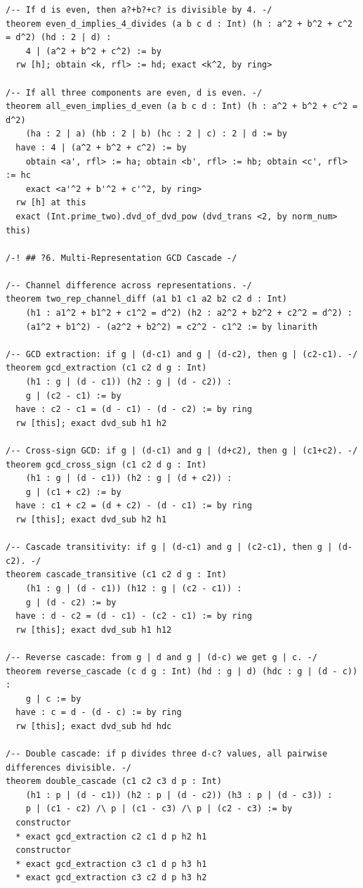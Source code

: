 \documentclass[11pt,twoside,openright]{book}
\theoremstyle{definition}
\theoremstyle{remark}
\begin{document}
\begin{lstlisting}[style=lean]
/-- If d is even, then a?+b?+c? is divisible by 4. -/
theorem even_d_implies_4_divides (a b c d : Int) (h : a^2 + b^2 + c^2 = d^2) (hd : 2 | d) :
    4 | (a^2 + b^2 + c^2) := by
  rw [h]; obtain <k, rfl> := hd; exact <k^2, by ring>

/-- If all three components are even, d is even. -/
theorem all_even_implies_d_even (a b c d : Int) (h : a^2 + b^2 + c^2 = d^2)
    (ha : 2 | a) (hb : 2 | b) (hc : 2 | c) : 2 | d := by
  have : 4 | (a^2 + b^2 + c^2) := by
    obtain <a', rfl> := ha; obtain <b', rfl> := hb; obtain <c', rfl> := hc
    exact <a'^2 + b'^2 + c'^2, by ring>
  rw [h] at this
  exact (Int.prime_two).dvd_of_dvd_pow (dvd_trans <2, by norm_num> this)

/-! ## ?6. Multi-Representation GCD Cascade -/

/-- Channel difference across representations. -/
theorem two_rep_channel_diff (a1 b1 c1 a2 b2 c2 d : Int)
    (h1 : a1^2 + b1^2 + c1^2 = d^2) (h2 : a2^2 + b2^2 + c2^2 = d^2) :
    (a1^2 + b1^2) - (a2^2 + b2^2) = c2^2 - c1^2 := by linarith

/-- GCD extraction: if g | (d-c1) and g | (d-c2), then g | (c2-c1). -/
theorem gcd_extraction (c1 c2 d g : Int)
    (h1 : g | (d - c1)) (h2 : g | (d - c2)) :
    g | (c2 - c1) := by
  have : c2 - c1 = (d - c1) - (d - c2) := by ring
  rw [this]; exact dvd_sub h1 h2

/-- Cross-sign GCD: if g | (d-c1) and g | (d+c2), then g | (c1+c2). -/
theorem gcd_cross_sign (c1 c2 d g : Int)
    (h1 : g | (d - c1)) (h2 : g | (d + c2)) :
    g | (c1 + c2) := by
  have : c1 + c2 = (d + c2) - (d - c1) := by ring
  rw [this]; exact dvd_sub h2 h1

/-- Cascade transitivity: if g | (d-c1) and g | (c2-c1), then g | (d-c2). -/
theorem cascade_transitive (c1 c2 d g : Int)
    (h1 : g | (d - c1)) (h12 : g | (c2 - c1)) :
    g | (d - c2) := by
  have : d - c2 = (d - c1) - (c2 - c1) := by ring
  rw [this]; exact dvd_sub h1 h12

/-- Reverse cascade: from g | d and g | (d-c) we get g | c. -/
theorem reverse_cascade (c d g : Int) (hd : g | d) (hdc : g | (d - c)) :
    g | c := by
  have : c = d - (d - c) := by ring
  rw [this]; exact dvd_sub hd hdc

/-- Double cascade: if p divides three d-c? values, all pairwise differences divisible. -/
theorem double_cascade (c1 c2 c3 d p : Int)
    (h1 : p | (d - c1)) (h2 : p | (d - c2)) (h3 : p | (d - c3)) :
    p | (c1 - c2) /\ p | (c1 - c3) /\ p | (c2 - c3) := by
  constructor
  * exact gcd_extraction c2 c1 d p h2 h1
  constructor
  * exact gcd_extraction c3 c1 d p h3 h1
  * exact gcd_extraction c3 c2 d p h3 h2


\end{lstlisting}
\end{document}
